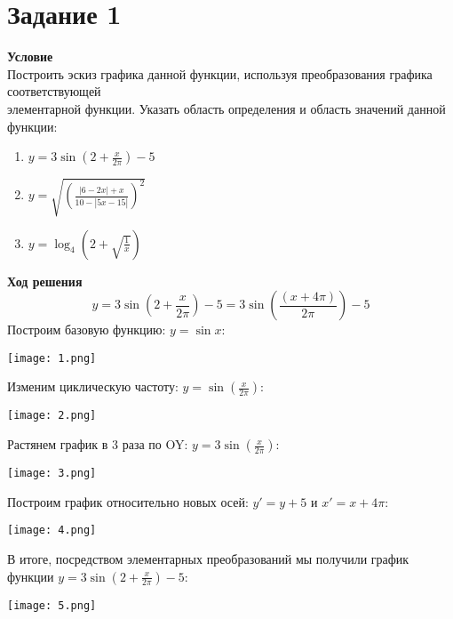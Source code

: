 \newpage
\section{Задание 1}
 {\bf\large Условие} \\Построить эскиз графика данной функции, используя преобразования
графика соответствующей \\ элементарной функции. Указать область определения и область значений данной функции:
\begin{enumerate}
    \item $y =3\sin{\left(2+\frac{x}{2\pi}\right)}-5$
    \item $y =\sqrt{\left(\frac{|6-2x|+x}{10-|5x-15|}\right)^2}$
    \item $y =\log_4{\left(2+\sqrt{\frac{1}{x}}\right)}$
\end{enumerate}
{\bf\large Ход решения} 
\[
    y =3\sin{\left(2+\frac{x}{2\pi}\right)}-5 = 3\sin{\left(\frac{(x+4\pi)}{2\pi}\right)}-5
\]
Построим базовую функцию: $y = \sin{x}$: \\
\begin{center}\texttt{[image: 1.png]}\end{center}
Изменим циклическую частоту: $y = \sin{\left(\frac{x}{2\pi}\right)}$: \\
\begin{center}\texttt{[image: 2.png]}\end{center}
Растянем график в 3 раза по OY: $y = 3\sin{\left(\frac{x}{2\pi}\right)}$:
\begin{center}\texttt{[image: 3.png]}\end{center}
Построим график относительно новых осей: 
$y' = y + 5$ и $x' = x + 4\pi$:
\begin{center}\texttt{[image: 4.png]}\end{center}
В итоге, посредством элементарных преобразований мы получили график функции $y =3\sin{\left(2+\frac{x}{2\pi}\right)}-5$:
\begin{center}\texttt{[image: 5.png]}\end{center}
\newpage



